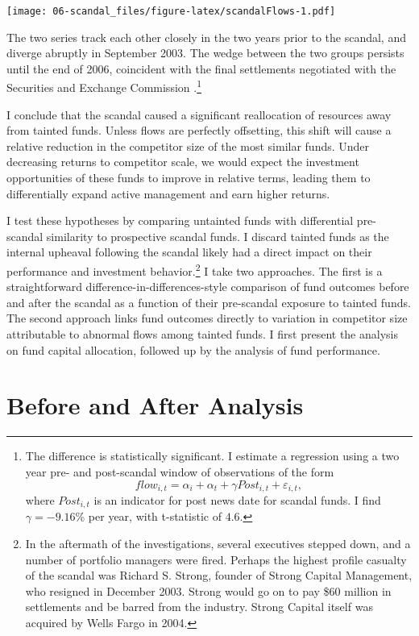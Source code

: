 \documentclass[]{book}
\let\rmarkdownfootnote\footnote%
\def\footnote{\protect\rmarkdownfootnote}
\theoremstyle{definition}
\theoremstyle{definition}
\theoremstyle{definition}
\theoremstyle{remark}
\begin{document}
\texttt{[image: 06-scandal\_files/figure-latex/scandalFlows-1.pdf]}

The two series track each other closely in the two years prior to the
scandal, and diverge abruptly in September 2003. The wedge between the
two groups persists until the end of 2006, coincident with the final
settlements negotiated with the Securities and Exchange Commission
\citep{zitzewitz09}.\footnote{The difference is statistically
  significant. I estimate a regression using a two year pre- and
  post-scandal window of observations of the form \[
  flow_{i,t}=\alpha_i + \alpha_t + \gamma Post_{i,t} +\varepsilon_{i,t},
  \] where \(Post_{i,t}\) is an indicator for post news date for scandal
  funds. I find \(\gamma=-9.16\)\% per year, with t-statistic of
  \(4.6\).}

I conclude that the scandal caused a significant reallocation of
resources away from tainted funds. Unless flows are perfectly
offsetting, this shift will cause a relative reduction in the competitor
size of the most similar funds. Under decreasing returns to competitor
scale, we would expect the investment opportunities of these funds to
improve in relative terms, leading them to differentially expand active
management and earn higher returns.

I test these hypotheses by comparing untainted funds with differential
pre-scandal similarity to prospective scandal funds. I discard tainted
funds as the internal upheaval following the scandal likely had a direct
impact on their performance and investment behavior.\footnote{In the
  aftermath of the investigations, several executives stepped down, and
  a number of portfolio managers were fired. Perhaps the highest profile
  casualty of the scandal was Richard S. Strong, founder of Strong
  Capital Management, who resigned in December 2003. Strong would go on
  to pay \$60 million in settlements and be barred from the industry.
  Strong Capital itself was acquired by Wells Fargo in 2004.} I take two
approaches. The first is a straightforward
difference-in-differences-style comparison of fund outcomes before and
after the scandal as a function of their pre-scandal exposure to tainted
funds. The second approach links fund outcomes directly to variation in
competitor size attributable to abnormal flows among tainted funds. I
first present the analysis on fund capital allocation, followed up by
the analysis of fund performance.

\hypertarget{sec:scandalID}{%
\section{Before and After Analysis}\label{sec:scandalID}}
\end{document}
